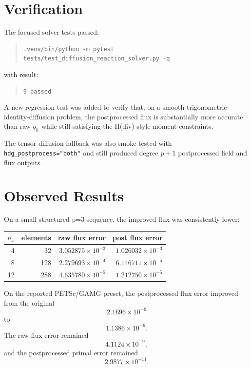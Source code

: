 \documentclass[11pt]{article}
\begin{document}
\section{Verification}

The focused solver tests passed:
\begin{quote}
\verb|.venv/bin/python -m pytest tests/test_diffusion_reaction_solver.py -q|
\end{quote}
with result:
\begin{quote}
\verb|9 passed|
\end{quote}

A new regression test was added to verify that, on a smooth trigonometric
identity-diffusion problem, the postprocessed flux is substantially more
accurate than raw $q_h$ while still satisfying the H(div)-style moment
constraints.

The tensor-diffusion fallback was also smoke-tested with
\verb|hdg_postprocess="both"| and still produced degree $p+1$ postprocessed
field and flux outputs.

\section{Observed Results}

On a small structured p=3 sequence, the improved flux was consistently lower:
\begin{center}
\begin{tabular}{rrrr}
\toprule
$n_x$ & elements & raw flux error & post flux error \\
\midrule
4  & 32  & $3.052875 \times 10^{-3}$ & $1.026032 \times 10^{-3}$ \\
8  & 128 & $2.279693 \times 10^{-4}$ & $6.146711 \times 10^{-5}$ \\
12 & 288 & $4.635780 \times 10^{-5}$ & $1.212750 \times 10^{-5}$ \\
\bottomrule
\end{tabular}
\end{center}

On the reported PETSc/GAMG preset, the postprocessed flux error improved from
the original
\[
2.1696 \times 10^{-9}
\]
to
\[
1.1386 \times 10^{-9}.
\]
The raw flux error remained
\[
4.1124 \times 10^{-9},
\]
and the postprocessed primal error remained
\[
2.9877 \times 10^{-11}.
\]
\end{document}
